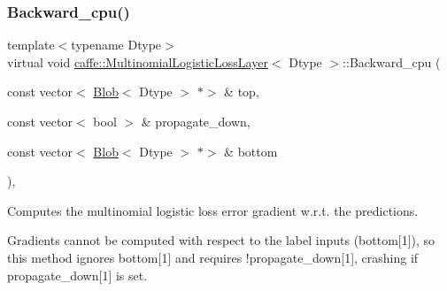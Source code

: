 \subsubsection{\texorpdfstring{Backward\+\_\+cpu()}{Backward\_cpu()}\hspace{0.1cm}{\footnotesize\ttfamily [2/2]}}
{\footnotesize\ttfamily template$<$typename Dtype$>$ \\
virtual void \mbox{\hyperlink{classcaffe_1_1_multinomial_logistic_loss_layer}{caffe\+::\+Multinomial\+Logistic\+Loss\+Layer}}$<$ Dtype $>$\+::Backward\+\_\+cpu (\begin{DoxyParamCaption}\item[{const vector$<$ \mbox{\hyperlink{classcaffe_1_1_blob}{Blob}}$<$ Dtype $>$ $\ast$$>$ \&}]{top,  }\item[{const vector$<$ bool $>$ \&}]{propagate\+\_\+down,  }\item[{const vector$<$ \mbox{\hyperlink{classcaffe_1_1_blob}{Blob}}$<$ Dtype $>$ $\ast$$>$ \&}]{bottom }\end{DoxyParamCaption})\hspace{0.3cm}{\ttfamily [protected]}, {\ttfamily [virtual]}}



Computes the multinomial logistic loss error gradient w.\+r.\+t. the predictions. 

Gradients cannot be computed with respect to the label inputs (bottom\mbox{[}1\mbox{]}), so this method ignores bottom\mbox{[}1\mbox{]} and requires !propagate\+\_\+down\mbox{[}1\mbox{]}, crashing if propagate\+\_\+down\mbox{[}1\mbox{]} is set.


